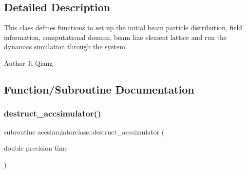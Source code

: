 \subsection{Detailed Description}
This class defines functions to set up the initial beam particle distribution, field information, computational domain, beam line element lattice and run the dynamics simulation through the system. 

\begin{DoxyAuthor}{Author}
Ji Qiang 
\end{DoxyAuthor}


\subsection{Function/\+Subroutine Documentation}
\mbox{\label{namespaceaccsimulatorclass_a7bcc6275f447513b2ea5d85d46aade2a}} 
\subsubsection{\texorpdfstring{destruct\_accsimulator()}{destruct\_accsimulator()}}
{\footnotesize\ttfamily subroutine accsimulatorclass\+::destruct\+\_\+accsimulator (\begin{DoxyParamCaption}\item[{double precision}]{time }\end{DoxyParamCaption})}

